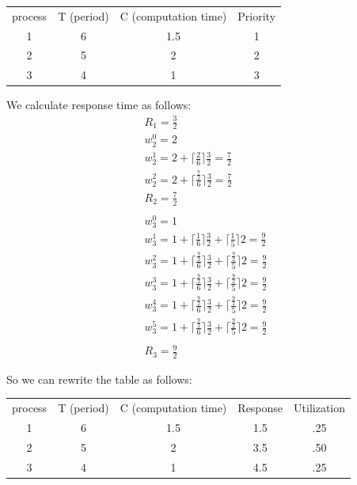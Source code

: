 \documentclass[11pt,letterpaper]{article}
\begin{document}
\begin{tabular}{ c c c c }
	process	&	T (period)		& C (computation time) 	& Priority \\
	1		&	6			& 1.5 				& 1 \\
	2		&	5			& 2 					& 2 \\
	3		&	4			& 1 					& 3 \\
\end{tabular}

We calculate response time as follows:
\begin{eqnarray}
	R_1 = \frac{3}{2} \\
	w_{2}^{0} = 2 \\
	w_{2}^{1} = 2 + \lceil \frac{2}{6} \rceil \frac{3}{2} = \frac{7}{2} \\
	w_{2}^{2} = 2 + \lceil \frac{\frac{7}{2}}{6} \rceil \frac{3}{2} = \frac{7}{2} \\  	
	R_2 = \frac{7}{2} \\
	\\
	w_{3}^{0} = 1 \\
	w_{3}^{1} = 1+ \lceil \frac{1}{6} \rceil \frac{3}{2} + \lceil \frac{1}{5} \rceil 2 
			= \frac{9}{2} \\
	w_{3}^{2} = 1+ \lceil \frac{\frac{9}{2}}{6} \rceil \frac{3}{2} + \lceil \frac{\frac{9}{2}}{5} \rceil 2 
			= \frac{9}{2} \\
	w_{3}^{3} = 1+ \lceil \frac{\frac{9}{2}}{6} \rceil \frac{3}{2} + \lceil \frac{\frac{9}{2}}{5} \rceil 2 
			= \frac{9}{2} \\
	w_{3}^{4} = 1+ \lceil \frac{\frac{9}{2}}{6} \rceil \frac{3}{2} + \lceil \frac{\frac{9}{2}}{5} \rceil 2 
			= \frac{9}{2} \\
	w_{3}^{5} = 1+ \lceil \frac{\frac{9}{2}}{6} \rceil \frac{3}{2} + \lceil \frac{\frac{9}{2}}{5} \rceil 2 
			= \frac{9}{2} \\
	\\
	R_3 = \frac{9}{2}
\end{eqnarray}

So we can rewrite the table as follows:

\begin{tabular}{ c c c c  c }
	process	&	T (period)		& C (computation time) 	& Response	& Utilization \\
	1		&	6			& 1.5 				& 1.5 		& .25 \\
	2		&	5			& 2 					& 3.5 		& .50 \\
	3		&	4			& 1 					& 4.5 		& .25 \\
\end{tabular}
\end{document}
